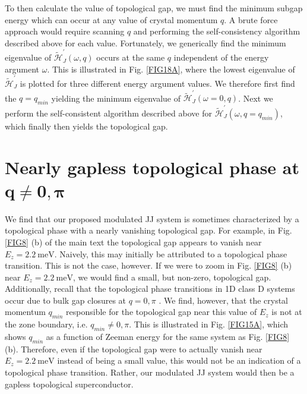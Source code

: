 \documentclass[twocolumn,aps,prb,nofootinbib]{revtex4-2}
\begin{document}
To then calculate the value of topological gap, we must find the minimum subgap energy which can occur at any value of crystal momentum $q$. A brute force approach would require scanning $q$ and performing the self-consistency algorithm described above for each value. Fortunately, we generically find the minimum  eigenvalue of $\widetilde{\mathcal{H}}_{J}^{\prime}(\omega,q)$ occurs at the same $q$ independent of the energy argument $\omega$. This is illustrated in Fig. \ref{FIG18A}, where the lowest eigenvalue of $\widetilde{\mathcal{H}}_{J}^{\prime}$ is plotted for three different energy argument values. We therefore first find the $q = q_{min}$ yielding the minimum eigenvalue of $\widetilde{\mathcal{H}}_{J}^{\prime}(\omega = 0,q)$. Next we perform the self-consistent algorithm described above for $\widetilde{\mathcal{H}}_{J}^{\prime}(\omega,q = q_{min})$, which finally then yields the topological gap.

\section{Nearly gapless topological phase at $\mathbf{q\neq 0,\pi}$} 

We find that our proposed modulated JJ system is sometimes characterized by a topological phase with a nearly vanishing topological gap. For example, in Fig. \ref{FIG8} (b) of the main text the topological gap appears to vanish near $E_z = 2.2~\text{meV}$. Naively, this may initially be attributed to a topological phase transition. This is not the case, however. If we were to zoom in Fig. \ref{FIG8} (b) near $E_z = 2.2~\text{meV}$, we would find a small, but non-zero, topological gap. Additionally, recall that the topological phase transitions in 1D class D systems occur due to bulk gap closures at $q = 0,\pi$ \cite{Chiu2016}. We find, however, that the crystal momentum $q_{min}$ responsible for the topological gap near this value of $E_z$ is not at the zone boundary, i.e. $q_{min} \neq 0,\pi$. This is illustrated in Fig. \ref{FIG15A}, which shows $q_{min}$ as a function of Zeeman energy for the same system as Fig. \ref{FIG8} (b). Therefore, even if the topological gap were to actually vanish near $E_z = 2.2~\text{meV}$ instead of being a small value, this would not be an indication of a topological phase transition. Rather, our modulated JJ system would then be a gapless topological superconductor. 
\end{document}
